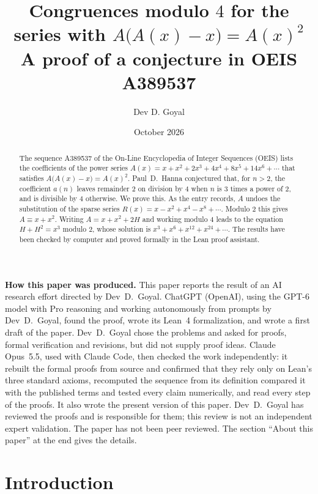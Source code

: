 \documentclass[11pt,a4paper]{article}
\title{Congruences modulo $4$ for the series with $A\bigl(A(x)-x\bigr)=A(x)^2$\\[6pt]\large A proof of a conjecture in OEIS A389537}
\author{Dev D. Goyal}
\date{October 2026}
\theoremstyle{definition}
\theoremstyle{remark}
\begin{document}
\maketitle
\begin{abstract}
The sequence A389537 of the On-Line Encyclopedia of Integer Sequences (OEIS) lists the coefficients of the power series
$A(x)=x+x^2+2x^3+4x^4+8x^5+14x^6+\cdots$ that satisfies $A\bigl(A(x)-x\bigr)=A(x)^2$. Paul~D.~Hanna conjectured that,
for $n>2$, the coefficient $a(n)$ leaves remainder $2$ on division by $4$ when $n$ is $3$ times a power of $2$, and is
divisible by $4$ otherwise. We prove this. As the entry records, $A$ undoes the substitution of the sparse series
$R(x)=x-x^2+x^4-x^8+\cdots$. Modulo $2$ this gives $A\equiv x+x^2$. Writing $A=x+x^2+2H$ and working modulo $4$
leads to the equation $H+H^2=x^3$ modulo $2$, whose solution is $x^3+x^6+x^{12}+x^{24}+\cdots$. The results have been
checked by computer and proved formally in the Lean proof assistant.
\end{abstract}
\begin{center}\begin{minipage}{0.88\linewidth}\small
\textbf{How this paper was produced.} This paper reports the result of an AI research effort directed by
Dev~D.~Goyal. ChatGPT (OpenAI), using the GPT-6 model with Pro reasoning and working autonomously from prompts by
Dev~D.~Goyal, found the proof, wrote its Lean~4 formalization, and wrote a first draft of the paper.
Dev~D.~Goyal chose the problems and asked for proofs, formal verification and revisions, but did not supply proof
ideas. Claude Opus~5.5, used with Claude Code, then checked the work independently: it rebuilt the formal proofs from
source and confirmed that they rely only on Lean's three standard axioms, recomputed the sequence from its definition
compared it with the published terms and tested every claim numerically, and read every step of the proofs. It also wrote the present
version of this paper.
Dev~D.~Goyal has reviewed the proofs and is responsible for them; this review is not an independent expert validation.
The paper has not been peer reviewed.
The section ``About this paper'' at the end gives the details.
\end{minipage}\end{center}

\section{Introduction}
\end{document}
